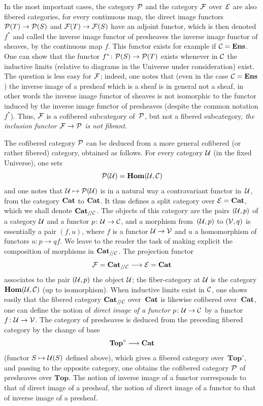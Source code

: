 \begin{enumerate}
In the most important cases, the category $\cal{P}$ and the
category $\cal{F}$ over~$\cal{E}$ are also
fibered categories, \ie for every continuous map, the
direct image functors $\cal{P}(T)\to \cal{P}(S)$ and
$\cal{F}(T)\to\cal{F}(S)$ have an adjoint functor, which is then
denoted $f^*$ and called the inverse image functor of
presheaves \resp the inverse image functor of sheaves, by
the continuous map $f$. This functor exists for example if
$\cal{C}=\Ens$. One can show that the functor $f^*\colon
\cal{P}(S)\to \cal{P}(T)$ exists whenever in $\cal{C}$ the
inductive limits (relative to diagrams in the Universe
under consideration) exist. The question is less easy for
$\cal{F}$; indeed, one notes that (even in the case
$\cal{C}=\Ens$) the inverse image of a presheaf which is a
sheaf is in general not a sheaf, in other words the
inverse image functor of sheaves is not isomorphic to the functor
induced by the inverse image functor of presheaves (despite
the common notation $f^*$). Thus, $\cal{F}$ is a
cofibered subcategory of~$\cal{P}$, but not a
fibered subcategory, \ie \emph{the inclusion functor
$\cal{F}\to\cal{P}$ is not fibrant}.

The cofibered category $\cal{P}$ can be deduced from a more
general cofibered (or rather fibered) category,
obtained as follows. For every category $\cal{U}$ (in
the fixed Universe), one sets
$$
\cal{P}(\cal{U})=\SheafHom(\cal{U},\cal{C})
$$
and
one notes that $\cal{U}\mto\cal{P}(\cal{U})$ is in a
natural way a contravariant functor in~$\cal{U}$, from the category
$\Cat$ to $\Cat$. It thus defines a split category
over $\cal{E}=\Cat$, which we shall denote $\Cat_{/\!/\cal{C}}$. The
objects of this category are the pairs $(\cal{U},p)$ of a
category $\cal{U}$ and a functor $p\colon\cal{U}\to\cal{C}$,
and a morphism from~$(\cal{U},p)$ to $(\cal{V},q)$ is
essentially a pair $(f,u)$, where $f$ is a functor
$\cal{U}\to\cal{V}$ and $u$ a homomorphism of functors $u\colon p\to
qf$. We leave to the reader the task of making explicit the composition of
morphisms in $\Cat_{/\!/\cal{C}}$. The projection functor
$$
\cal{F}=\Cat_{/\!/\cal{C}}\to\cal{E}=\Cat
$$
associates to the pair $(\cal{U},p)$ the object $\cal{U}$; the
fiber-category at $\cal{U}$ is the category
$\SheafHom(\cal{U},\cal{C})$ (up to isomorphism). When
inductive limits exist in $\cal{C}$, one shows easily
that the fibered category $\Cat_{/\!/\cal{C}}$ over~$\Cat$ is
likewise cofibered over~$\Cat$, \ie one can define the
notion of \emph{direct image of a functor} $p\colon\cal{U}\to\cal{C}$
by a functor $f\colon\cal{U}\to\cal{V}$. The category of
presheaves is deduced from the preceding fibered category
by the change of base
$$
\mathbf{Top}^\circ\to\Cat
$$
(functor $S\mto\cal{U}(S)$ defined above), which gives a
fibered category over~$\mathbf{Top}^\circ$, and passing to
the opposite category, one obtains the
cofibered category $\cal{P}$ of presheaves over
$\mathbf{Top}$. The notion of inverse image of a functor corresponds
to that of direct image of a presheaf, the notion of direct
image of a functor to that of inverse image of a
presheaf.


\end{enumerate}
